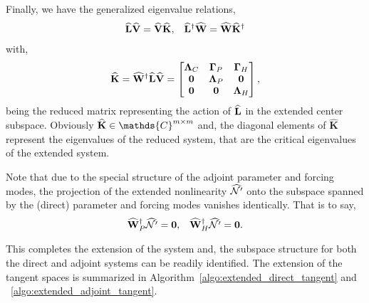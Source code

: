 Finally, we have the generalized eigenvalue relations,
\begin{align}
	\label{eqn:extended_generalized_eigenvalue}
	\mathbf{\widehat{L}}\widehat{\mathbf{V}} = \widehat{\mathbf{V}}\mathbf{\widehat{K}}, && \mathbf{\widehat{L}}^{\dagger}\widehat{\mathbf{W}} = \widehat{\mathbf{W}}\mathbf{\widehat{K}}^{\dagger}
\end{align}
with, 
\begin{eqnarray}
	\label{eqn:khat}
	\mathbf{\widehat{K}} = \mathbf{\widehat{W}}^{\dagger}\mathbf{\widehat{L}}\widehat{\mathbf{V}} = 
	\begin{bmatrix}
		\mathbf{\Lambda}_{C} & \mathbf{\Gamma}_{P} & \mathbf{\Gamma}_{H} \\ 
		\mathbf{0} &  \mathbf{\Lambda}_{P} & \mathbf{0} \\ 
		\mathbf{0} & \mathbf{0} & \mathbf{\Lambda}_{H}
	\end{bmatrix},
\end{eqnarray}
being the reduced matrix representing the action of $\mathbf{\widehat{L}}$ in the extended center subspace. Obviously $\Khat\in\mathds{C}^{m\times m}$ and, the diagonal elements of $\mathbf{\widehat{K}}$ represent the eigenvalues of the reduced system, that are the critical eigenvalues of the extended system.

Note that due to the special structure of the adjoint parameter and forcing modes, the projection of the extended nonlinearity $\widehat{\mathcal{N}'}$ onto the subspace spanned by the (direct) parameter and forcing modes vanishes identically. That is to say,
\begin{align}
		\label{eqn:vanishing_extended_fhat}
		\widehat{\mathbf{W}}^{\dagger}_{P}\widehat{\mathcal{N}'} = \mathbf{0}, && \widehat{\mathbf{W}}^{\dagger}_{H}\widehat{\mathcal{N}'} = \mathbf{0}. 
\end{align}

This completes the extension of the system and, the subspace structure for both the direct and adjoint systems can be readily identified. The extension of the tangent spaces is summarized in Algorithm~\ref{algo:extended_direct_tangent} and ~\ref{algo:extended_adjoint_tangent}.

